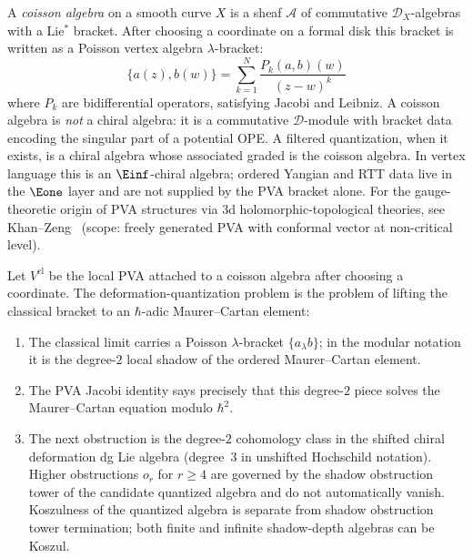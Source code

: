 \begin{remark}
\label{rem:coisson-curve}
A \emph{coisson algebra} on a smooth curve $X$ is a sheaf
$\mathcal{A}$ of commutative $\mathcal{D}_X$-algebras with a
Lie$^*$ bracket. After choosing a coordinate on a formal disk this
bracket is written as a Poisson vertex algebra $\lambda$-bracket:
\[\{a(z), b(w)\} = \sum_{k=1}^N \frac{P_k(a,b)(w)}{(z-w)^k}\]
where $P_k$ are bidifferential operators, satisfying Jacobi and Leibniz.
A coisson algebra is \emph{not} a chiral algebra: it is a commutative
$\mathcal{D}$-module with bracket data encoding the singular part of a
potential OPE. A filtered quantization, when it exists, is a chiral
algebra whose associated graded is the coisson algebra. In vertex
language this is an $\Einf$-chiral algebra; ordered Yangian and RTT
data live in the $\Eone$ layer and are not supplied by the PVA bracket
alone. For the gauge-theoretic origin of PVA structures via 3d
holomorphic-topological theories, see Khan--Zeng~\cite{KhanZeng25}
(scope: freely generated PVA with conformal vector at non-critical
level).
\end{remark}

\begin{construction}
\label{constr:dq-shadow-mc}
Let $V^{\mathrm{cl}}$ be the local PVA attached to a coisson algebra
after choosing a coordinate. The deformation-quantization problem is
the problem of lifting the classical bracket to an $\hbar$-adic
Maurer--Cartan element:
\begin{enumerate}[label=\textup{(\roman*)}]
\item The classical limit carries a Poisson $\lambda$-bracket
 $\{a_\lambda b\}$; in the modular notation it is the degree-$2$ local
 shadow of the ordered Maurer--Cartan element.
\item The PVA Jacobi identity says precisely that this degree-$2$
 piece solves the Maurer--Cartan equation modulo $\hbar^2$.
\item The next obstruction is the degree-$2$ cohomology class in the
 shifted chiral deformation dg Lie algebra (degree~$3$ in unshifted
 Hochschild notation). Higher obstructions $o_r$ for $r \geq 4$ are
 governed by the shadow obstruction tower of the candidate quantized
 algebra and do not automatically vanish. Koszulness of the quantized
 algebra is separate from shadow obstruction tower termination; both
 finite and infinite shadow-depth algebras can be Koszul.
\end{enumerate}
\end{construction}

